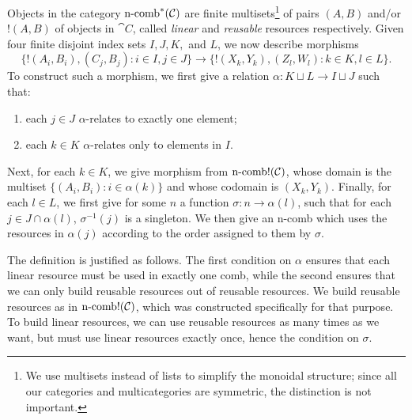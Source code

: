 \begin{dfn}\label{def:ncomba}
Objects in the category
$\operatorname*{n-comb}^*({\mathcal{C}})$ are finite multisets\footnote{
  We use multisets instead of lists to simplify the monoidal structure; since
  all our categories and multicategories are symmetric, the distinction is not
  important.
} of pairs $(A, B)$ and/or $!(A, B)$ of objects in $\cat{C}$, called
\emph{linear} and \emph{reusable} resources respectively. Given four
finite disjoint index sets $I,J,K,$ and $L$, we now describe morphisms
 \[
   \{!(A_i, B_i), (C_j, B_j): i\in I, j\in J\}\to \{!(X_k, Y_k), (Z_l, W_l):
   k\in K, l\in L\}.
\] To construct such a morphism, we first give a relation $\alpha: K\sqcup L\to I\sqcup J$ such
that:
\begin{enumerate}
  \item each $j\in J$ $\alpha$-relates to exactly one element;
  \item each $k\in K$ $\alpha$-relates only to elements in $I$.
\end{enumerate}
Next, for each $k\in K$, we give morphism from $\operatorname*{n-comb!}({\mathcal{C}})$, whose domain
is the multiset $\{(A_i, B_i): i\in \alpha(k)\}$ and whose codomain is $(X_k,
Y_k)$. Finally, for each $l\in L$, we first give for some $n$ a function
$\sigma: n\to \alpha(l)$, such that for each $j\in J\cap\alpha(l)$,
$\sigma^{-1}(j)$ is a singleton. We then give an n-comb which uses the resources in
$\alpha(j)$ according to the order assigned to them by $\sigma$.
\end{dfn}
The definition is justified as follows. The first condition on $\alpha$ ensures
that each linear resource must be used in exactly one comb, while the second
ensures that we can only build reusable resources out of reusable resources.
We build reusable resources as in $\operatorname*{n-comb!}({\mathcal{C}})$, which was constructed
specifically for that purpose. To build linear resources, we can use
reusable resources as many times as we want, but must use linear resources
exactly once, hence the condition on $\sigma$.




